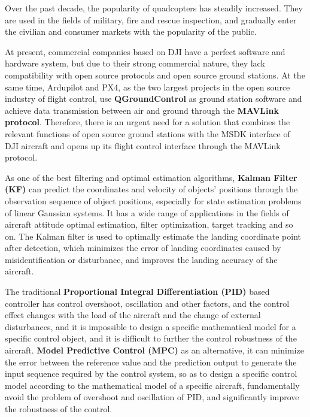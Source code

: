 \begin{enabstract}
Over the past decade, the popularity of quadcopters has steadily increased. They are used in the fields of military, fire and rescue inspection, and gradually enter the civilian and consumer markets with the popularity of the public.

At present, commercial companies based on DJI have a perfect software and hardware system, but due to their strong commercial nature, they lack compatibility with open source protocols and open source ground stations. At the same time, Ardupilot and PX4, as the two largest projects in the open source industry of flight control, use \textbf{QGroundControl} as ground station software and achieve data transmission between air and ground through the \textbf{MAVLink protocol}. Therefore, there is an urgent need for a solution that combines the relevant functions of open source ground stations with the MSDK interface of DJI aircraft and opens up its flight control interface through the MAVLink protocol.
  
As one of the best filtering and optimal estimation algorithms, \textbf{Kalman Filter (KF)} can predict the coordinates and velocity of objects' positions through the observation sequence of object positions, especially for state estimation problems of linear Gaussian systems. It has a wide range of applications in the fields of aircraft attitude optimal estimation, filter optimization, target tracking and so on. The Kalman filter is used to optimally estimate the landing coordinate point after detection, which minimizes the error of landing coordinates caused by misidentification or disturbance, and improves the landing accuracy of the aircraft.
  
The traditional \textbf{Proportional Integral Differentiation (PID)} based controller has control overshoot, oscillation and other factors, and the control effect changes with the load of the aircraft and the change of external disturbances, and it is impossible to design a specific mathematical model for a specific control object, and it is difficult to further the control robustness of the aircraft. \textbf{Model Predictive Control (MPC)} as an alternative, it can minimize the error between the reference value and the prediction output to generate the input sequence required by the control system, so as to design a specific control model according to the mathematical model of a specific aircraft, fundamentally avoid the problem of overshoot and oscillation of PID, and significantly improve the robustness of the control.
  

\end{enabstract}
